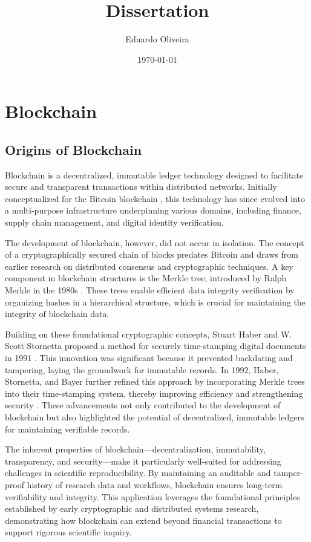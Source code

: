 \documentclass{article}
\title{Dissertation}
\author{Eduardo Oliveira}
\date{\today}
\begin{document}
\maketitle



\section{Blockchain}

\subsection{Origins of Blockchain}

Blockchain is a decentralized, immutable ledger technology designed to facilitate secure and transparent transactions within distributed networks. Initially conceptualized for the Bitcoin blockchain \cite{nakamoto2012bitcoin}, this technology has since evolved into a multi-purpose infrastructure underpinning various domains, including finance, supply chain management, and digital identity verification.

The development of blockchain, however, did not occur in isolation. The concept of a cryptographically secured chain of blocks predates Bitcoin and draws from earlier research on distributed consensus and cryptographic techniques. A key component in blockchain structures is the Merkle tree, introduced by Ralph Merkle in the 1980s \cite{goos_digital_1988}. These trees enable efficient data integrity verification by organizing hashes in a hierarchical structure, which is crucial for maintaining the integrity of blockchain data.

Building on these foundational cryptographic concepts, Stuart Haber and W. Scott Stornetta proposed a method for securely time-stamping digital documents in 1991 \cite{haber_how_1991}. This innovation was significant because it prevented backdating and tampering, laying the groundwork for immutable records. In 1992, Haber, Stornetta, and Bayer further refined this approach by incorporating Merkle trees into their time-stamping system, thereby improving efficiency and strengthening security \cite{bayer_improving_1993}. These advancements not only contributed to the development of blockchain but also highlighted the potential of decentralized, immutable ledgers for maintaining verifiable records.

The inherent properties of blockchain—decentralization, immutability, transparency, and security—make it particularly well-suited for addressing challenges in scientific reproducibility. By maintaining an auditable and tamper-proof history of research data and workflows, blockchain ensures long-term verifiability and integrity. This application leverages the foundational principles established by early cryptographic and distributed systems research, demonstrating how blockchain can extend beyond financial transactions to support rigorous scientific inquiry.



\end{document}

